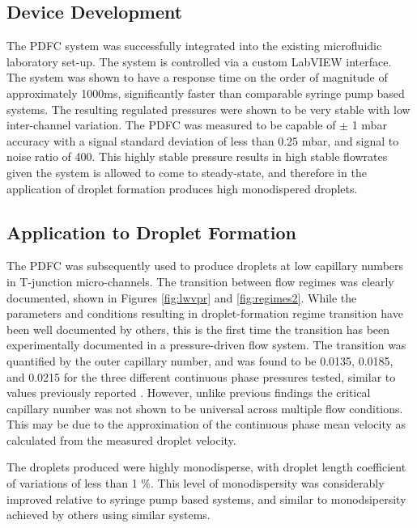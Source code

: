 \subsection{Device Development}

The PDFC system was successfully integrated into the existing microfluidic laboratory set-up. The system is controlled via a custom LabVIEW interface. The system was shown to have a response time on the order of magnitude of approximately 1000ms, significantly faster than comparable syringe pump based systems\cite{Bong2011}. The resulting regulated pressures were shown to be very stable with low inter-channel variation. The PDFC was measured to be capable of $\pm$ 1 mbar accuracy with a signal standard deviation of less than 0.25 mbar, and signal to noise ratio of 400. This highly stable pressure results in high stable flowrates given the system is allowed to come to steady-state, and therefore in the application of droplet formation produces high monodispered droplets.

\subsection{Application to Droplet Formation}
The PDFC was subsequently used to produce droplets at low capillary numbers in T-junction micro-channels. The transition between flow regimes was clearly documented, shown in Figures \vref{fig:lwvpr} and \vref{fig:regimes2}. While the parameters and conditions resulting in droplet-formation regime transition have been well documented by others, this is the first time the transition has been experimentally documented in a pressure-driven flow system. The transition was quantified by the outer capillary number, and was found to be 0.0135, 0.0185, and 0.0215 for the three different continuous phase pressures tested, similar to values previously reported \cite{Christopher2008,DeMenech2008}. However, unlike previous findings the critical capillary number was not shown to be universal across multiple flow conditions. This may be due to the approximation of the continuous phase mean velocity as calculated from the measured droplet velocity. 

The droplets produced were highly monodisperse, with droplet length coefficient of variations of less than 1 \%. This level of monodispersity was considerably improved relative to syringe pump based systems, and similar to monodsipersity achieved by others using similar systems\cite{Lim2015, Kaminski2016}.
